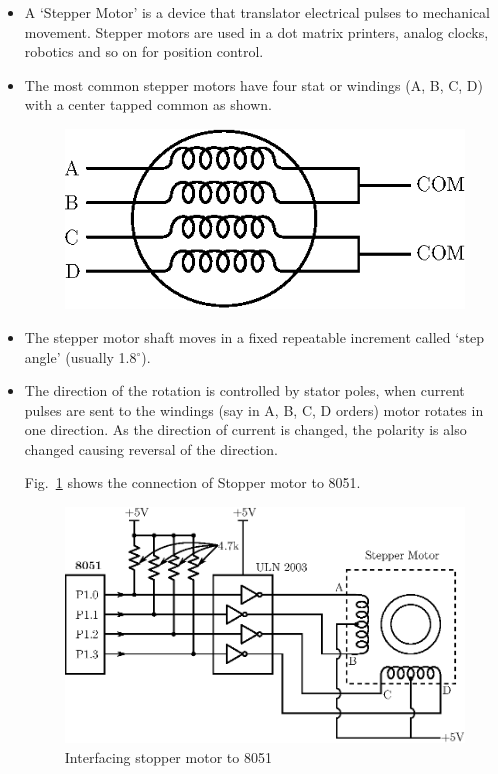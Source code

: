 \begin{itemize}
\item A `Stepper Motor' is a device that translator electrical pulses to mechanical movement. Stepper motors are used in a dot matrix printers, analog clocks, robotics and so on for position control.

\item The most common stepper motors have four stat or windings (A, B, C, D) with a center tapped common as shown.
\begin{figure}[H]
\centering
\includegraphics{chap7/fig7.3.eps}
\end{figure}

\item The stepper motor shaft moves in a fixed repeatable increment called `step angle' (usually 1.8$^{\circ}$).

\item The direction of the rotation is controlled by stator poles, when current pulses are sent to the windings (say in A, B, C, D orders) motor rotates in one direction. As the direction of current is changed, the polarity is also changed causing reversal of the direction.

Fig.~\ref{fig7.3} shows the connection of Stopper motor to 8051.
\begin{figure}[H]
\centering
\includegraphics{chap7/fig7.4.eps}
\caption{Interfacing stopper motor to 8051}\label{fig7.3}
\end{figure}


\end{itemize}
